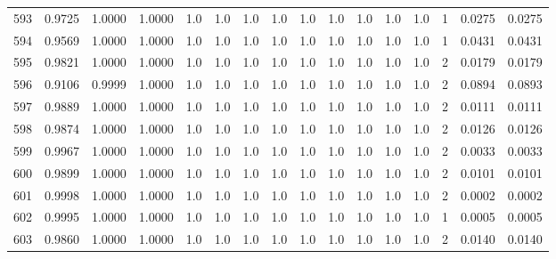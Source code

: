 \begin{tabular}{lrrrrrrrrrrrrrrr}
593 &      0.9725 &  1.0000 &  1.0000 &     1.0 &     1.0 &     1.0 &     1.0 &     1.0 &     1.0 &     1.0 &      1.0 &        1.0 &      1 &                    0.0275 &                     0.0275 \\
594 &      0.9569 &  1.0000 &  1.0000 &     1.0 &     1.0 &     1.0 &     1.0 &     1.0 &     1.0 &     1.0 &      1.0 &        1.0 &      1 &                    0.0431 &                     0.0431 \\
595 &      0.9821 &  1.0000 &  1.0000 &     1.0 &     1.0 &     1.0 &     1.0 &     1.0 &     1.0 &     1.0 &      1.0 &        1.0 &      2 &                    0.0179 &                     0.0179 \\
596 &      0.9106 &  0.9999 &  1.0000 &     1.0 &     1.0 &     1.0 &     1.0 &     1.0 &     1.0 &     1.0 &      1.0 &        1.0 &      2 &                    0.0894 &                     0.0893 \\
597 &      0.9889 &  1.0000 &  1.0000 &     1.0 &     1.0 &     1.0 &     1.0 &     1.0 &     1.0 &     1.0 &      1.0 &        1.0 &      2 &                    0.0111 &                     0.0111 \\
598 &      0.9874 &  1.0000 &  1.0000 &     1.0 &     1.0 &     1.0 &     1.0 &     1.0 &     1.0 &     1.0 &      1.0 &        1.0 &      2 &                    0.0126 &                     0.0126 \\
599 &      0.9967 &  1.0000 &  1.0000 &     1.0 &     1.0 &     1.0 &     1.0 &     1.0 &     1.0 &     1.0 &      1.0 &        1.0 &      2 &                    0.0033 &                     0.0033 \\
600 &      0.9899 &  1.0000 &  1.0000 &     1.0 &     1.0 &     1.0 &     1.0 &     1.0 &     1.0 &     1.0 &      1.0 &        1.0 &      2 &                    0.0101 &                     0.0101 \\
601 &      0.9998 &  1.0000 &  1.0000 &     1.0 &     1.0 &     1.0 &     1.0 &     1.0 &     1.0 &     1.0 &      1.0 &        1.0 &      2 &                    0.0002 &                     0.0002 \\
602 &      0.9995 &  1.0000 &  1.0000 &     1.0 &     1.0 &     1.0 &     1.0 &     1.0 &     1.0 &     1.0 &      1.0 &        1.0 &      1 &                    0.0005 &                     0.0005 \\
603 &      0.9860 &  1.0000 &  1.0000 &     1.0 &     1.0 &     1.0 &     1.0 &     1.0 &     1.0 &     1.0 &      1.0 &        1.0 &      2 &                    0.0140 &                     0.0140 \\

\end{tabular}
